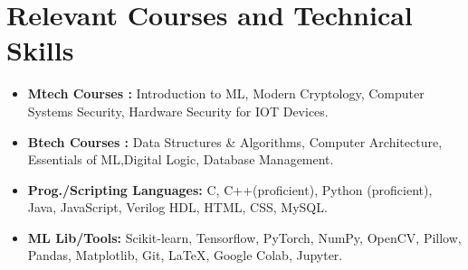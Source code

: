 \documentclass[10.8pt, a4paper]{extarticle}
\newcommand{\shorterSection}[1]{\vspace{-10pt}\section{#1}}
\begin{document}
\vspace{1mm}



\shorterSection{Relevant Courses and Technical Skills}
\begin{itemize}
\item \textbf{Mtech Courses :} Introduction to ML, Modern Cryptology, Computer Systems Security, Hardware Security for IOT Devices.
\item \textbf{Btech Courses :} Data Structures \& Algorithms, Computer Architecture, Essentials of ML,Digital Logic, Database Management.
\item \textbf{Prog./Scripting Languages:} C, C++(proficient), Python (proficient), Java, JavaScript, Verilog HDL, HTML, CSS, MySQL.
\item \textbf{ML Lib/Tools:} Scikit-learn, Tensorflow, PyTorch, NumPy, OpenCV, Pillow, Pandas, Matplotlib, Git, \LaTeX, Google Colab, Jupyter. 
 \medskip
\end{itemize}

\vspace{0mm}

\end{document}
